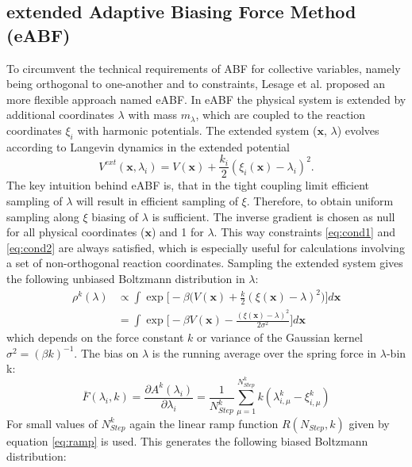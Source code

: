 \subsection{extended Adaptive Biasing Force Method (eABF)}
\label{sec:eABF}
To circumvent the technical requirements of ABF for collective variables, namely being orthogonal to one-another and to constraints, Lesage et al.\autocite{lesage2017smoothed} proposed an more flexible approach named eABF.
In eABF the physical system is extended by additional coordinates $\lambda$ with mass $m_{\lambda}$, which are coupled to the reaction coordinates $\xi_i$ with harmonic potentials. The extended system ($\textbf{x}$, $\lambda$) evolves according to Langevin dynamics in the extended potential
\begin{equation}
  V^{ext}(\textbf{x},\lambda_i) = V(\textbf{x}) + \frac{k_i}{2}(\xi_{i}(\textbf{x})-\lambda_i)^2.
\end{equation}
The key intuition behind eABF is, that in the tight coupling limit efficient sampling of $\lambda$ will result in efficient sampling of $\xi$. Therefore, to obtain uniform sampling along $\xi$ biasing of $\lambda$ is sufficient. The inverse gradient is chosen as null for all physical coordinates ($\textbf{x}$) and 1 for $\lambda$. This way constraints \ref{eq:cond1} and \ref{eq:cond2} are always satisfied, which is especially useful for calculations involving a set of non-orthogonal reaction coordinates.
Sampling the extended system gives the following unbiased Boltzmann distribution in $\lambda$:
\begin{equation}
\begin{aligned}
  \rho^k(\lambda) &\propto
  \int \exp \biggl[-\beta \biggl(V(\textbf{x})+\frac{k}{2}(\xi(\textbf{x})-\lambda)^2 \biggr) \biggr] d\textbf{x} \\
  &= \int \exp \biggl[-\beta V(\textbf{x}) - \frac{(\xi(\textbf{x})-\lambda)^2}{2\sigma^2} \biggr] d\textbf{x}
\end{aligned}
\end{equation}
which depends on the force constant $k$ or variance of the Gaussian kernel $\sigma^2=(\beta k)^{-1}$.
The bias on $\lambda$ is the running average over the spring force in $\lambda$-bin k:
\begin{equation}
  \overline{F}(\lambda_{i}, k) = \frac{\partial A^{k}(\lambda_{i})}{\partial \lambda_i} = \frac{1}{N_{Step}^{k}} \sum_{\mu=1}^{N_{Step}^{k}} k(\lambda_{i,\mu}^{k}-\xi_{i,\mu}^{k})
\end{equation}
For small values of $N_{Step}^{k}$ again the linear ramp function $R(N_{Step},k)$ given by equation \ref{eq:ramp} is used. This generates the following biased Boltzmann distribution:
